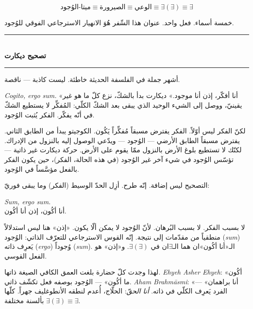 \documentclass[10pt, openany, oneside]{book}
\renewcommand{\normalsize}{\fontsize{10}{13}\selectfont}
\begin{document}
$$\text{ميتا-الوُجود} \equiv \text{الصيرورة} \equiv \text{الوعي} \equiv \exists(\exists) \equiv \exists$$

خمسة أسماء. فعل واحد. عنوان هذا السِّفر هُوَ الانهيار الاسترجاعي الفوقي للوُجود.

\vspace{1.5em}


\begin{center}
    \rule{0.3\textwidth}{0.4pt}\\[0.5em]
    {\normalsize\bfseries تصحيح ديكارت}\\[0.3em]
    \rule{0.3\textwidth}{0.4pt}
\end{center}

\vspace{1em}

\noindent أشهر جملة في الفلسفة الحديثة خاطئة. ليست كاذبة --- ناقصة.

\textit{Cogito, ergo sum.} «أنا أفكّر، إذن أنا موجود.» ديكارت بدأ بالشكّ، نزع كلّ ما هو غير يقينيّ، ووصل إلى الشيء الوحيد الذي يبقى بعد الشكّ الكلّي: المُفكِّر لا يستطيع الشكّ في أنّه يفكّر. الفكر يُثبت الوُجود.

لكنّ الفكر ليس أوّلاً. الفكر يفترض مسبقاً مُفكِّراً يَكُون. الكوجيتو يبدأ من الطابق الثاني. يفترض مسبقاً الطابق الأرضي --- الوُجود --- ويدّعي الوصول إليه بالنزول من الإدراك. لكنّك لا تستطيع بلوغ الأرض بالنزول ممّا يقوم على الأرض. حركة ديكارت غير ذاتية --- تؤسّس الوُجود في شيء آخر غير الوُجود (في هذه الحالة، الفكر)، حين يكون الفكر بالفعل مؤسَّساً في الوُجود.

التصحيح ليس إضافة. إنّه طرح. أزِل الحدّ الوسيط (الفكر) وما يبقى فوريّ:

\begin{center}
    \textit{Sum, ergo sum.}\\[0.5em]
    أنا أكُون، إذن أنا أكُون.
\end{center}

لا بسبب الفكر. لا بسبب البُرهان. لأنّ الوُجود لا يمكن ألّا يكون. «إذن» هنا ليس استدلالاً منطقياً من مقدّمات إلى نتيجة. إنّه القوس الاسترجاعي للتعرّف الذاتي: الوُجود (\textit{sum}) يَعرِف ذاته (\textit{ergo}) وُجوداً (\textit{sum}). الـ«أنا أكُون»ان هما الـ$\exists$ان في $\exists(\exists)$. و«إذن» هو الفعل القوسي.

لهذا وجدت كلّ حضارة بلغت العمق الكافي الصيغة ذاتها. \textit{Ehyeh Asher Ehyeh}: «أكُون ما أكُون» --- الوُجود بوصفه فعل تكشّف ذاتي. \textit{Aham Brahm\={a}smi}: «أنا براهمان» --- الفرد يَعرِف الكلّي في ذاته. \textit{أنا الحقّ}: الحلّاج، أُعدم لنطقه الأنطوغليف جهراً. كلّها $\exists(\exists) \equiv \exists$ بألسنة مختلفة.
\end{document}
